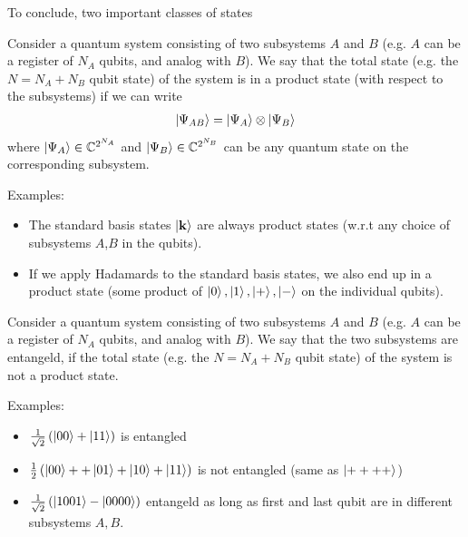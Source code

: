 To conclude, two important classes of states
\begin{def*}
Consider a quantum system consisting of two subsystems $A$ and $B$ (e.g. $A$ can be a register of $N_A$ qubits, and analog with $B$). We say that the total state (e.g. the $N=N_A + N_B$ qubit state) of the system is in a product state (with respect to the subsystems) if we can write 
\begin{align}
    \ket{\Psi_{AB}} = \ket{\Psi_A} \otimes \ket{\Psi_B}
\end{align}
where $\ket{\Psi_A}\in \mathbb{C}^{2^{N_A}}$ and $\ket{\Psi_B}\in \mathbb{C}^{2^{N_B}}$ can be any quantum state on the corresponding subsystem. 
\end{def*}
Examples: 
\begin{itemize}
    \item The standard basis states $\ket{\mathbf{k}}$ are always product states (w.r.t any choice of subsystems $A$,$B$ in the qubits). 
    \item If we apply Hadamards to the standard basis states, we also end up in a product state (some product of $\ket{0},\ket{1},\ket{+},\ket{-}$ on the individual qubits).
\end{itemize}
\begin{def*}[entangelement]
    Consider a quantum system consisting of two subsystems $A$ and $B$ (e.g. $A$ can be a register of $N_A$ qubits, and analog with $B$). We say that the two subsystems are entangeld, if the total state (e.g. the $N=N_A + N_B$ qubit state) of the system is not a product state.
\end{def*}
Examples:
\begin{itemize}
    \item $\frac{1}{\sqrt{2}}\left(\ket{00} + \ket{11}\right)$ is entangled
    \item $\frac{1}{2}\left(\ket{00} + +\ket{01} + \ket{10} + \ket{11}\right)$ is not entangled (same as $\ket{++++}$)
    \item $\frac{1}{\sqrt{2}}\left(\ket{1001} - \ket{0000}\right)$ entangeld as long as first and last qubit are in different subsystems $A,B$.
\end{itemize}
